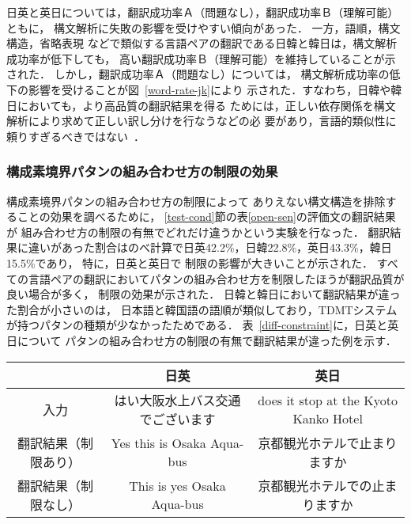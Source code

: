 日英と英日については，翻訳成功率Ａ（問題なし），翻訳成功率Ｂ（理解可能）ともに，
構文解析に失敗の影響を受けやすい傾向があった．
一方，語順，構文構造，省略表現
などで類似する言語ペアの翻訳である日韓と韓日は，構文解析成功率が低下しても，
高い翻訳成功率Ｂ（理解可能）を維持していることが示された．
しかし，翻訳成功率Ａ（問題なし）については，
構文解析成功率の低下の影響を受けることが図~\ref{word-rate-jk}により
示された．すなわち，日韓や韓日においても，より高品質の翻訳結果を得る
ためには，正しい依存関係を構文解析により求めて正しい訳し分けを行なうなどの必
要があり，言語的類似性に頼りすぎるべきではない~\cite{Kim}．


\subsubsection{構成素境界パタンの組み合わせ方の制限の効果}

構成素境界パタンの組み合わせ方の制限によって
ありえない構文構造を排除することの効果を調べるために， 
\ref{test-cond}節の表\ref{open-sen}の評価文の翻訳結果が
組み合わせ方の制限の有無でどれだけ違うかという実験を行なった．
翻訳結果に違いがあった割合はのべ計算で日英42.2\%，日韓22.8\%，英日43.3\%，韓日15.5\%であり，
特に，日英と英日で
制限の影響が大きいことが示された．
すべての言語ペアの翻訳においてパタンの組み合わせ方を制限したほうが翻訳品質が良い場合が多く，
制限の効果が示された．
日韓と韓日において翻訳結果が違った割合が小さいのは，
日本語と韓国語の語順が類似しており，TDMTシステムが持つパタンの種類が少なかったためである．
表~\ref{diff-constraint}に，日英と英日について
パタンの組み合わせ方の制限の有無で翻訳結果が違った例を示す．

\begin{table*}[hbt]
\begin{center}
 \caption{パタンの組み合わせ方の制限の有無で翻訳結果が違った例}
 \label{diff-constraint}
\begin{small}
\tabcolsep=1.4mm
\begin{tabular}{|c||c|c|} \hline
&日英 & 英日 \\ \hline
入力 & はい大阪水上バス交通でございます & does it stop at the Kyoto Kanko Hotel \\  \hline 
翻訳結果（制限あり） & Yes this is Osaka Aqua-bus & 京都観光ホテルで止まりますか \\  \hline
翻訳結果（制限なし） & This is yes Osaka Aqua-bus & 京都観光ホテルでの止まりますか \\ \hline 
\end{tabular}
\end{small}
\end{center}
\end{table*}

